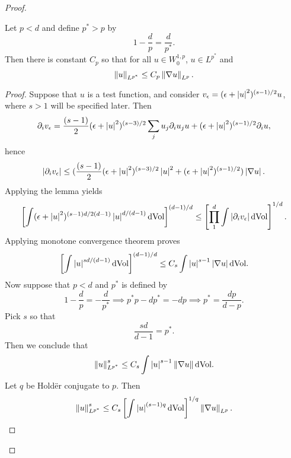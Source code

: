 \begin{proof}
  \begin{claim}
    Let $p<d$ and define $p^{*}>p$ by
    \begin{equation*}
      1-\frac{d}{p}=\frac{d}{p^{*}}.
    \end{equation*}
    Then there is constant $C_{p}$ so that for all $u\in W^{1,p}_{0}$, $u\in L^{p^{*}}$ and
    \begin{equation*}
      \left\lVert u\right\rVert_{L^{p^{*}}}\le C_{p}\left\lVert\nabla u\right\rVert_{L^{p}}.
    \end{equation*}
    \begin{proof}     
  Suppose that $u$ is a test function, and consider $v_{\epsilon}=(\epsilon+\left|u\right|^{2})^{(s-1)/2}u$, where $s>1$ will be specified later. Then
  \begin{equation*}
    \partial_{i}v_{\epsilon}=\frac{(s-1)}{2} (\epsilon+\left|u\right|^{2})^{(s-3)/2}\sum_{j}u_{j}\partial_{i}u_{j} u+(\epsilon+\left|u\right|^{2})^{(s-1)/2}\partial_{i}u,
  \end{equation*}
  hence
  \begin{equation*}
    \left|\partial_{i}v_{\epsilon}\right|\le (\frac{(s-1)}{2}(\epsilon+\left|u\right|^{2})^{(s-3)/2}\left|u\right|^{2}+(\epsilon+\left|u\right|^{2})^{(s-1)/2})\left|\nabla u\right|.
  \end{equation*}
  Applying the lemma yields
  \begin{equation*}
    \left[\int (\epsilon+\left|u\right|^{2})^{(s-1)d/2(d-1)}\left|u\right|^{d/(d-1)}\mathrm{d}\mathrm{Vol}\right]^{(d-1)/d}\le \left[\prod_{1}^{d}\int\left|\partial_{i}v_{\epsilon}\right|\mathrm{d}\mathrm{Vol}\right]^{1/d}.
  \end{equation*}
  Applying monotone convergence theorem proves
  \begin{equation*}    \left[\int\left|u\right|^{sd/(d-1)}\mathrm{d}\mathrm{Vol}\right]^{(d-1)/d}\le C_{s}\int \left|u\right|^{s-1}\left|\nabla u\right|\mathrm{d}\mathrm{Vol}.
  \end{equation*}
  Now suppose that $p<d$ and $p^{*}$ is defined by
  \begin{equation*}
    1-\frac{d}{p}=-\frac{d}{p^{*}}\implies p^{*}p-dp^{*}=-dp\implies p^{*}=\frac{dp}{d-p}.
  \end{equation*}
  Pick $s$ so that
  \begin{equation*}
    \frac{sd}{d-1}=p^{*}.
  \end{equation*}
  Then we conclude that
  \begin{equation*}
    \left\lVert u\right\rVert_{L^{p^{*}}}^{s}\le C_{s}\int \left|u\right|^{s-1}\left\lVert\nabla u\right\rVert\mathrm{dVol}.
  \end{equation*}
  Let $q$ be Hold\"er conjugate to $p$. Then
  \begin{equation*}
    \norm{u}_{L^{p^{*}}}^{s}\le C_{s}\left[\int \abs{u}^{(s-1)q}\dVol\right]^{1/q}\norm{\nabla u}_{L^{p}}.

\end{equation*}
\end{proof}
\end{claim}
\end{proof}
